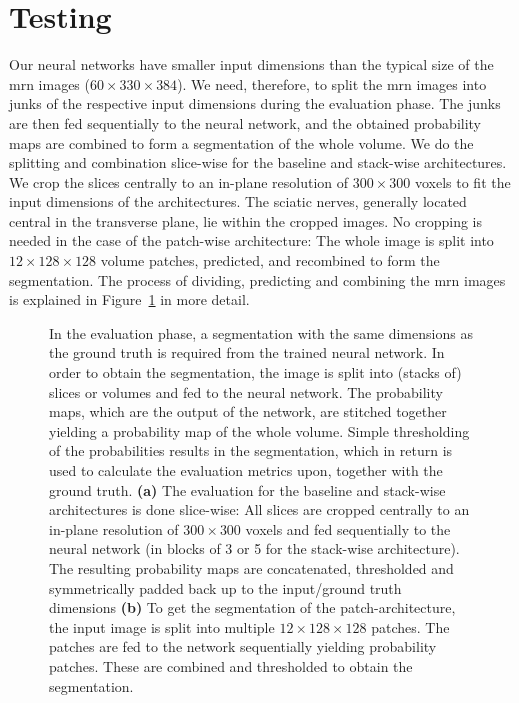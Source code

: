\section{Testing} \label{sec:testing}
Our neural networks have smaller input dimensions than the typical size of the \gls{mrn} images ($60 \times 330 \times 384$). We need, therefore, to split the \gls{mrn} images into junks of the respective input dimensions during the evaluation phase. The junks are then fed sequentially to the neural network, and the obtained probability maps are combined to form a segmentation of the whole volume. We do the splitting and combination slice-wise for the baseline and stack-wise architectures. We crop the slices centrally to an in-plane resolution of $300 \times 300$ voxels to fit the input dimensions of the architectures. The sciatic nerves, generally located central in the transverse plane, lie within the cropped images. No cropping is needed in the case of the patch-wise architecture: The whole image is split into $12 \times 128 \times 128$ volume patches, predicted, and recombined to form the segmentation. The process of dividing, predicting and combining the \gls{mrn} images is explained in Figure~\ref{fig:eval_strategy} in more detail.

\begin{figure}[htbp]
	\centering
	\hfill
	\caption[Evaluation Strategy]{In the evaluation phase, a segmentation with the same dimensions as the ground truth is required from the trained neural network. In order to obtain the segmentation, the image is split into (stacks of) slices or volumes and fed to the neural network. The probability maps, which are the output of the network, are stitched together yielding a probability map of the whole volume. Simple thresholding of the probabilities results in the segmentation, which in return is used to calculate the evaluation metrics upon, together with the ground truth. \textbf{(a)} The evaluation for the baseline and stack-wise architectures is done slice-wise: All slices are cropped centrally to an in-plane resolution of $300 \times 300$ voxels and fed sequentially to the neural network (in blocks of 3 or 5 for the stack-wise architecture). The resulting probability maps are concatenated, thresholded and symmetrically padded back up to the input/ground truth dimensions \textbf{(b)} To get the segmentation of the patch-architecture, the input image is split into multiple $12 \times 128 \times 128$ patches. The patches are fed to the network sequentially yielding probability patches. These are combined and thresholded to obtain the segmentation.}
	\label{fig:eval_strategy}  
\end{figure}


